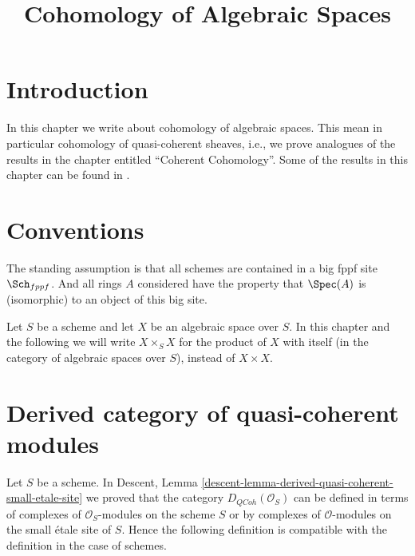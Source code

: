 

%


\title{Cohomology of Algebraic Spaces}

\maketitle

\label{section-phantom}

\tableofcontents




\section{Introduction}
\label{section-introduction}

\noindent
In this chapter we write about cohomology of algebraic spaces.
This mean in particular cohomology of quasi-coherent sheaves, i.e.,
we prove analogues of the results in the chapter entitled
``Coherent Cohomology''. Some of the results in this chapter can
be found in \cite{knutson}.





\section{Conventions}
\label{section-conventions}

\noindent
The standing assumption is that all schemes are contained in
a big fppf site $\Sch_{fppf}$. And all rings $A$ considered
have the property that $\Spec(A)$ is (isomorphic) to an
object of this big site.

\medskip\noindent
Let $S$ be a scheme and let $X$ be an algebraic space over $S$.
In this chapter and the following we will write $X \times_S X$
for the product of $X$ with itself (in the category of algebraic
spaces over $S$), instead of $X \times X$.




\section{Derived category of quasi-coherent modules}
\label{section-derived-quasi-coherent}

\noindent
Let $S$ be a scheme. In
Descent, Lemma \ref{descent-lemma-derived-quasi-coherent-small-etale-site}
we proved that the category $D_{QCoh}(\mathcal{O}_S)$ can be defined
in terms of complexes of $\mathcal{O}_S$-modules on the scheme $S$
or by complexes of $\mathcal{O}$-modules on the small \'etale site
of $S$. Hence the following definition is compatible with the definition
in the case of schemes.

